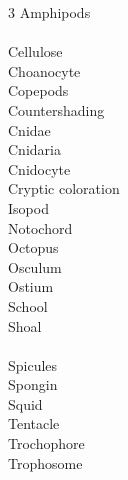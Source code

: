 
\begin{multicols}{3}
Amphipods\\
\\
Cellulose\\
Choanocyte\\
Copepods\\
Countershading\\
Cnidae\\
Cnidaria\\
Cnidocyte\\
Cryptic coloration\\
Isopod\\
Notochord\\
Octopus\\
Osculum\\
Ostium\\
School\\
Shoal\\
\\
Spicules\\
Spongin\\
Squid\\
Tentacle\\
Trochophore\\
Trophosome %
\end{multicols}
